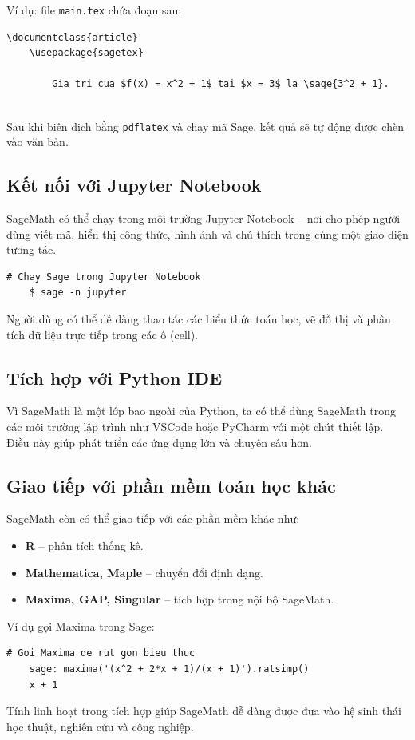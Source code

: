 Ví dụ: file \texttt{main.tex} chứa đoạn sau:

\begin{lstlisting}[basicstyle=\ttfamily\small]
	\documentclass{article}
	\usepackage{sagetex}
	
		Gia tri cua $f(x) = x^2 + 1$ tai $x = 3$ la \sage{3^2 + 1}.
	
\end{lstlisting}

Sau khi biên dịch bằng \texttt{pdflatex} và chạy mã Sage, kết quả sẽ tự động được chèn vào văn bản.

\subsection{Kết nối với Jupyter Notebook}

SageMath có thể chạy trong môi trường Jupyter Notebook – nơi cho phép người dùng viết mã, hiển thị công thức, hình ảnh và chú thích trong cùng một giao diện tương tác.

\begin{lstlisting}[basicstyle=\ttfamily\small]
	# Chay Sage trong Jupyter Notebook
	$ sage -n jupyter
\end{lstlisting}

Người dùng có thể dễ dàng thao tác các biểu thức toán học, vẽ đồ thị và phân tích dữ liệu trực tiếp trong các ô (cell).

\subsection{Tích hợp với Python IDE}

Vì SageMath là một lớp bao ngoài của Python, ta có thể dùng SageMath trong các môi trường lập trình như VSCode hoặc PyCharm với một chút thiết lập. Điều này giúp phát triển các ứng dụng lớn và chuyên sâu hơn.

\subsection{Giao tiếp với phần mềm toán học khác}

SageMath còn có thể giao tiếp với các phần mềm khác như:

\begin{itemize}
	\item \textbf{R} – phân tích thống kê.
	\item \textbf{Mathematica, Maple} – chuyển đổi định dạng.
	\item \textbf{Maxima, GAP, Singular} – tích hợp trong nội bộ SageMath.
\end{itemize}

Ví dụ gọi Maxima trong Sage:

\begin{lstlisting}[basicstyle=\ttfamily\small]
	# Goi Maxima de rut gon bieu thuc
	sage: maxima('(x^2 + 2*x + 1)/(x + 1)').ratsimp()
	x + 1
\end{lstlisting}

Tính linh hoạt trong tích hợp giúp SageMath dễ dàng được đưa vào hệ sinh thái học thuật, nghiên cứu và công nghiệp.

